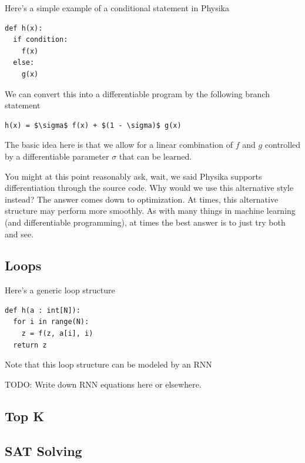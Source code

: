 \documentclass[book.tex]{subfiles}
\begin{document}
Here's a simple example of a conditional statement in Physika

\begin{lstlisting}
def h(x):
  if condition:
    f(x)
  else:
    g(x)
\end{lstlisting}

We can convert this into a differentiable program by the following branch statement

\begin{lstlisting}
h(x) = $\sigma$ f(x) + $(1 - \sigma)$ g(x) 
\end{lstlisting}

The basic idea here is that we allow for a linear combination of $f$ and $g$ controlled by a differentiable parameter $\sigma$ that can be learned.

You might at this point reasonably ask, wait, we said Physika supports differentiation through the source code. Why would we use this alternative style instead? The answer comes down to optimization. At times, this alternative structure may perform more smoothly. As with many things in machine learning (and differentiable programming), at times the best answer is to just try both and see.

\subsection{Loops}

Here's a generic loop structure

\begin{lstlisting}
def h(a : int[N]):
  for i in range(N):
    z = f(z, a[i], i)
  return z
\end{lstlisting}

Note that this loop structure can be modeled by an RNN

TODO: Write down RNN equations here or elsewhere.

\subsection{Top K}

\subsection{SAT Solving}
\end{document}
